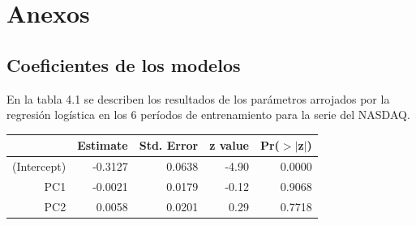 \documentclass[a4paper,12pt]{Latex/Classes/PhDthesisPSnPDF}
\begin{document}

\chapter{Anexos}

\section{Coeficientes de los modelos}

En la tabla 4.1 se describen los resultados de los parámetros arrojados por la regresión logística en los 6 períodos de entrenamiento para la serie del NASDAQ.
\begin{center}
\begin{table}[ht]
\centering
\begin{tabular}{rrrrr}
  \hline
 & Estimate & Std. Error & z value & Pr($>$$|$z$|$) \\ 
  \hline
(Intercept) & -0.3127 & 0.0638 & -4.90 & 0.0000 \\ 
  PC1 & -0.0021 & 0.0179 & -0.12 & 0.9068 \\ 
  PC2 & 0.0058 & 0.0201 & 0.29 & 0.7718 \\ 
   \hline
\end{tabular}
\end{table}\end{center}
\end{document}
